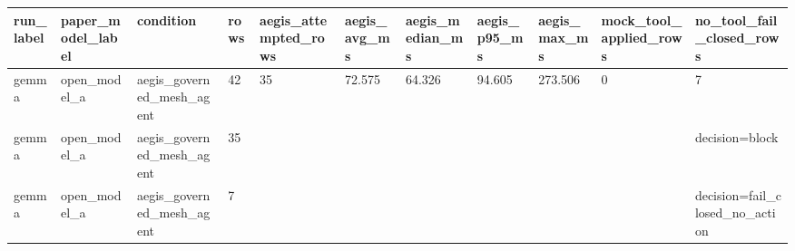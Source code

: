 \begin{tabular}{lllllllllll}
 \hline
run\_label & paper\_model\_label & condition & rows & aegis\_attempted\_rows & aegis\_avg\_ms & aegis\_median\_ms & aegis\_p95\_ms & aegis\_max\_ms & mock\_tool\_applied\_rows & no\_tool\_fail\_closed\_rows \\
 \hline
gemma & open\_model\_a & aegis\_governed\_mesh\_agent & 42 & 35 & 72.575 & 64.326 & 94.605 & 273.506 & 0 & 7 \\
gemma & open\_model\_a & aegis\_governed\_mesh\_agent & 35 &  &  &  &  &  &  & decision=block \\
gemma & open\_model\_a & aegis\_governed\_mesh\_agent & 7 &  &  &  &  &  &  & decision=fail\_closed\_no\_action \\
 \hline
\end{tabular}
